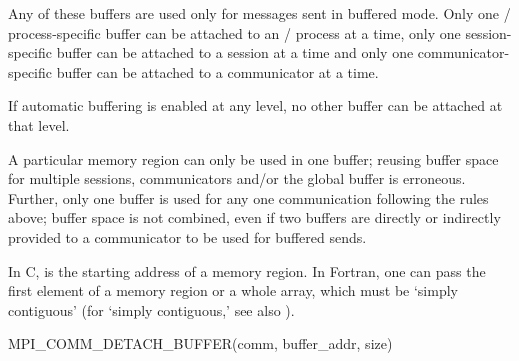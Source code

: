 Any of these buffers are used only for messages sent in buffered mode.
Only one \MPI/ process-specific buffer can be attached to an \MPI/ process at a time,
only one session-specific buffer can be attached to a session at a time and
only one communicator-specific buffer can be attached to a communicator at a time.

If automatic buffering is enabled at any level, no other buffer can be attached at that level.

A particular memory region can only be used in one buffer; reusing buffer space
for multiple sessions, communicators and/or the global buffer is erroneous.
Further, only one buffer is used for any one communication
following the rules above; buffer space is not combined, even if two buffers are directly
or indirectly provided  to a communicator to be used for buffered sends.

In C,  is the starting address of a memory region.
In Fortran, one can pass the first element of a memory region
or a whole array, which must be `simply contiguous'
(for `simply contiguous,' see also
).

\begin{funcdef}{MPI\_COMM\_DETACH\_BUFFER}{(\mbox{comm}, \mbox{buffer\_addr}, \mbox{size})}
\end{funcdef}

